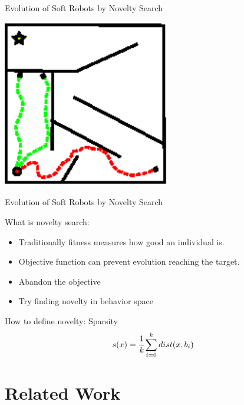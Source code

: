 \documentclass[6pt]{beamer}
\begin{document}
\begin{frame}{{\scriptsize Evolution of Soft Robots by} Novelty Search}
\begin{center}
\includegraphics[width=0.55\textwidth]{../Figures/Misc/maze4.eps}
\end{center}
\end{frame}

\begin{frame}{{\scriptsize Evolution of Soft Robots by} Novelty Search}
\begin{block}{What is novelty search:}
\begin{itemize}
\item Traditionally fitness measures how good an individual is.
\item Objective function can prevent evolution reaching the target.
\item Abandon the objective
\item Try finding novelty in behavior space
\end{itemize}
\end{block}
\begin{block}{How to define novelty: Sparsity}
\begin{equation*}
s(x) = \cfrac{1}{k} \sum_{i=0}^k dist(x, b_i)
\end{equation*}
\end{block}
\end{frame}


\section{Related Work}
\end{document}
